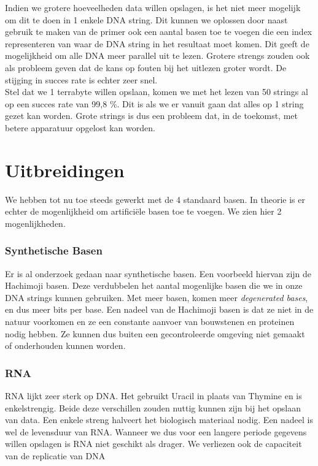 \documentclass{esannV2}
\begin{document}
Indien we grotere hoeveelheden data willen opslagen, is het niet meer mogelijk om dit te doen in 1 enkele DNA string. Dit kunnen we oplossen door naast gebruik te maken van de primer ook een aantal basen toe te voegen die een index representeren van waar de DNA string in het resultaat moet komen. Dit geeft de mogelijkheid om alle DNA meer parallel uit te lezen. Grotere strengs zouden ook als probleem geven dat de kans op fouten bij het uitlezen groter wordt. De stijging in succes rate is echter zeer snel.\\
Stel dat we 1 terrabyte willen opslaan, komen we met het lezen van 50 strings al op een  succes rate van 99,8 $\%$. Dit is als we er vanuit gaan dat alles op 1 string gezet kan worden. Grote strings is dus een probleem dat, in de toekomst, met betere apparatuur opgelost kan worden.

\newpage
\section{Uitbreidingen}

We hebben tot nu toe steeds gewerkt met de 4 standaard basen. In theorie is er echter de mogenlijkheid om artifici\"ele basen toe te voegen. We zien hier 2 mogenlijkheden. 

\subsubsection*{Synthetische Basen}
Er is al onderzoek gedaan naar synthetische basen. Een voorbeeld hiervan zijn de Hachimoji basen. Deze verdubbelen het aantal mogenlijke basen die we in onze DNA strings kunnen gebruiken. Met meer basen, komen meer \textit{degenerated bases}, en dus meer bits per base. Een nadeel van de Hachimoji basen is dat ze niet in de natuur voorkomen en ze een constante aanvoer van bouwstenen en proteinen nodig hebben. Ze kunnen dus buiten een gecontroleerde omgeving niet gemaakt of onderhouden kunnen worden.

\subsubsection*{RNA}
RNA lijkt zeer sterk op DNA. Het gebruikt Uracil in plaats van Thymine en is enkelstrengig. Beide deze verschillen zouden nuttig kunnen zijn bij het opslaan van data. Een enkele streng halveert het biologisch materiaal nodig. Een nadeel is wel de levensduur van RNA. Wanneer we dus voor een langere periode gegevens willen opslagen is RNA niet geschikt als drager. We verliezen ook de capaciteit van de replicatie van DNA
\end{document}
